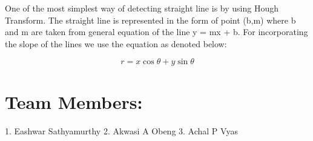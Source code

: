 \documentclass[12pt]{article}
\begin{document}
 One of the most simplest way of detecting straight line is by using Hough Transform. The straight line is represented in the form of point (b,m) where b and m are taken from general equation of the line y = mx + b. For incorporating the slope of the lines we use the equation as denoted below:

\begin{equation}
 r=x\cos \theta +y\sin \theta
\end{equation} 

\section{Team Members:}
1. Eashwar Sathyamurthy
2. Akwasi A Obeng
3. Achal P Vyas
\end{document}
